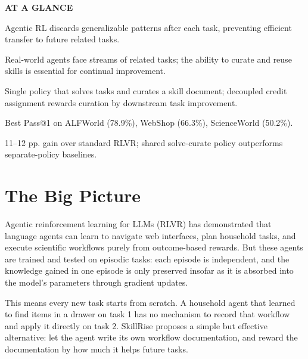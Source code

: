 \documentclass[10pt,twocolumn]{article}
\begin{document}
\begin{mdframed}[backgroundcolor=boxgray,linecolor=rulered,linewidth=1pt,
    innerleftmargin=6pt,innerrightmargin=6pt,
    innertopmargin=6pt,innerbottommargin=6pt]
\textbf{\small AT A GLANCE}\par\vspace{4pt}
\begin{description}[leftmargin=0pt,labelsep=4pt,itemsep=2pt,parsep=0pt,
    font=\small\bfseries]
  \item[Problem:] Agentic RL discards generalizable patterns after each
    task, preventing efficient transfer to future related tasks.
  \item[Why it matters:] Real-world agents face streams of related tasks;
    the ability to curate and reuse skills is essential for continual improvement.
  \item[Method:] Single policy that solves tasks and curates a skill
    document; decoupled credit assignment rewards curation by downstream
    task improvement.
  \item[Result:] Best Pass@1 on ALFWorld (78.9\%), WebShop (66.3\%),
    ScienceWorld (50.2\%).
  \item[Evidence:] 11--12 pp. gain over standard RLVR; shared solve-curate
    policy outperforms separate-policy baselines.
\end{description}
\end{mdframed}

\section{The Big Picture}

Agentic reinforcement learning for LLMs (RLVR) has demonstrated that
language agents can learn to navigate web interfaces, plan household tasks,
and execute scientific workflows purely from outcome-based rewards. But these
agents are trained and tested on episodic tasks: each episode is independent,
and the knowledge gained in one episode is only preserved insofar as
it is absorbed into the model's parameters through gradient updates.

This means every new task starts from scratch. A household agent that learned
to find items in a drawer on task 1 has no mechanism to record that workflow
and apply it directly on task 2. SkillRise proposes a simple but effective
alternative: let the agent write its own workflow documentation, and reward
the documentation by how much it helps future tasks.
\end{document}
